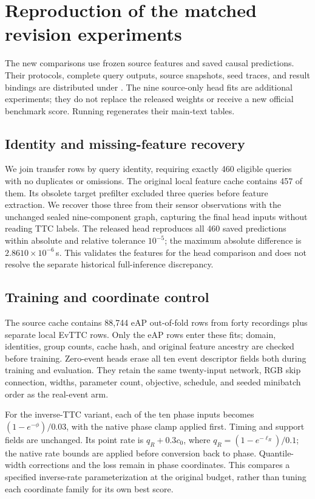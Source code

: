 \section{Reproduction of the matched revision experiments}
\label{app:consolidation-reproduction}
The new comparisons use frozen source features and saved causal predictions. Their protocols, complete query outputs, source snapshots, seed traces, and result bindings are distributed under . The nine source-only head fits are additional experiments; they do not replace the released weights or receive a new official benchmark score. Running  regenerates their main-text tables.

\subsection{Identity and missing-feature recovery}
We join transfer rows by query identity, requiring exactly 460 eligible queries with no duplicates or omissions. The original local feature cache contains 457 of them. Its obsolete target prefilter excluded three queries before feature extraction. We recover those three from their sensor observations with the unchanged sealed nine-component graph, capturing the final head inputs without reading TTC labels. The released head reproduces all 460 saved predictions within absolute and relative tolerance $10^{-5}$; the maximum absolute difference is $2.8610\times10^{-6}$\,s. This validates the features for the head comparison and does not resolve the separate historical full-inference discrepancy.

\subsection{Training and coordinate control}
The source cache contains 88,744 eAP out-of-fold rows from forty recordings plus separate local EvTTC rows. Only the eAP rows enter these fits; domain, identities, group counts, cache hash, and original feature ancestry are checked before training. Zero-event heads erase all ten event descriptor fields both during training and evaluation. They retain the same twenty-input network, RGB skip connection, widths, parameter count, objective, schedule, and seeded minibatch order as the real-event arm.

For the inverse-TTC variant, each of the ten phase inputs becomes $(1-e^{-\phi})/0.03$, with the native phase clamp applied first. Timing and support fields are unchanged. Its point rate is $q_R+0.3c_0$, where $q_R=(1-e^{-\ell_R})/0.1$; the native rate bounds are applied before conversion back to phase. Quantile-width corrections and the loss remain in phase coordinates. This compares a specified inverse-rate parameterization at the original budget, rather than tuning each coordinate family for its own best score.


